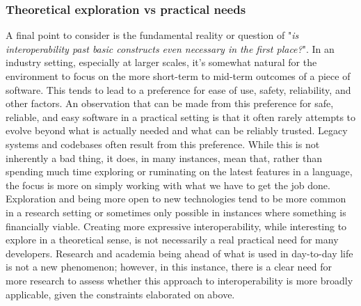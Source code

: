 \subsubsection{Theoretical exploration vs practical needs}

A final point to consider is the fundamental reality or question of "\textit{is interoperability past basic constructs even necessary in the first place?}". In an industry setting, especially at larger scales, it's somewhat natural for the environment to focus on the more short-term to mid-term outcomes of a piece of software. This tends to lead to a preference for ease of use, safety, reliability, and other factors. An observation that can be made from this preference for safe, reliable, and easy software in a practical setting is that it often rarely attempts to evolve beyond what is actually needed and what can be reliably trusted. Legacy systems and codebases often result from this preference. While this is not inherently a bad thing, it does, in many instances, mean that, rather than spending much time exploring or ruminating on the latest features in a language, the focus is more on simply working with what we have to get the job done. Exploration and being more open to new technologies tend to be more common in a research setting or sometimes only possible in instances where something is financially viable. Creating more expressive interoperability, while interesting to explore in a theoretical sense, is not necessarily a real practical need for many developers. Research and academia being ahead of what is used in day-to-day life is not a new phenomenon; however, in this instance, there is a clear need for more research to assess whether this approach to interoperability is more broadly applicable, given the constraints elaborated on above.
